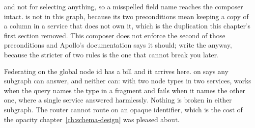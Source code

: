 \begin{chaptersummary}
        and not for selecting anything, so a misspelled field name reaches the
        composer intact.  is not in this graph, because its two
        preconditions mean keeping a copy of a column in a service that does
        not own it, which is the duplication this chapter's first section
        removed. This composer does not enforce the second of those
        preconditions and Apollo's documentation says it should; write the
         anyway, because the stricter of two rules is the one
        that cannot break you later.
  \item Federating on the global node id has a bill and it arrives here.
         on  says any subgraph can answer, and
        neither can: with two node types in two services, 
        works when the query names the type in a fragment and fails when it
        names the other one, where a single service answered harmlessly.
        Nothing is broken in either subgraph. The router cannot route on an
        opaque identifier, which is the cost of the opacity
        chapter~\ref{ch:schema-design} was pleased about.
\end{chaptersummary}
